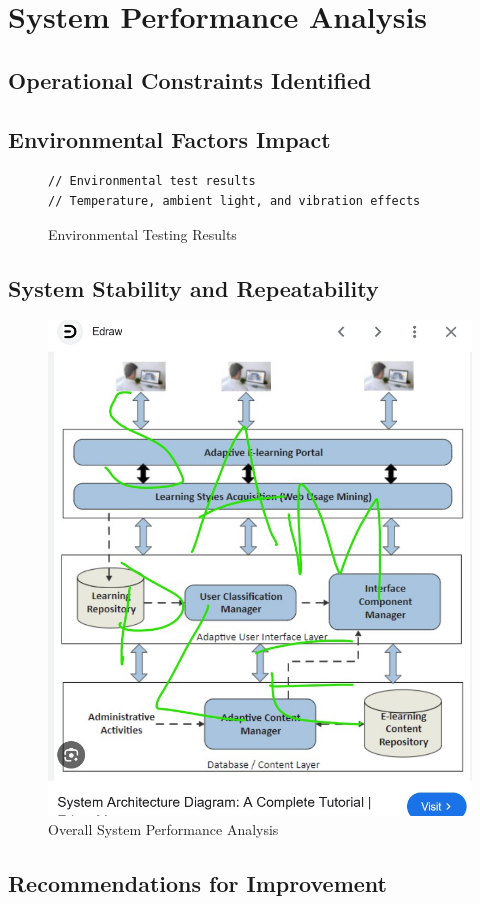\section{System Performance Analysis}

\subsection{Operational Constraints Identified}

\subsection{Environmental Factors Impact}

\begin{figure}[H]
\begin{lstlisting}[style=cstyle]
// Environmental test results
// Temperature, ambient light, and vibration effects
\end{lstlisting}
\caption{Environmental Testing Results}
\label{lst:EnvironmentalTests1}
\end{figure}

\subsection{System Stability and Repeatability}

\begin{figure}[htb]
    \centering
    \includegraphics[width=1\textwidth]{figures/results/system_architecture.jpg}
    \caption{Overall System Performance Analysis}
    \label{fig:systemPerformance}
\end{figure}

\subsection{Recommendations for Improvement}
